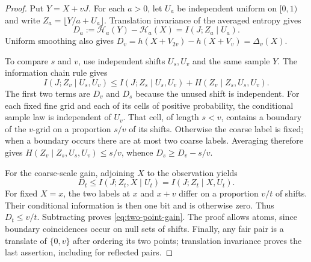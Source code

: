 \begin{proof}
Put $Y=X+vJ$.  For each $a>0$, let $U_a$ be independent uniform on
$[0,1)$ and write $Z_a=\lfloor Y/a+U_a\rfloor$.
Translation invariance of the averaged entropy gives
\[
 D_a:=\mathcal H_a(Y)-\mathcal H_a(X)=I(J;Z_a\mid U_a).
\]
Uniform smoothing also gives
$D_v=h(X+V_{2v})-h(X+V_v)=\Delta_v(X)$.

To compare $s$ and $v$, use independent shifts $U_s,U_v$ and the same
sample $Y$.  The information chain rule gives
\[
 I(J;Z_v\mid U_s,U_v)
 \le I(J;Z_s\mid U_s,U_v)
       +H(Z_v\mid Z_s,U_s,U_v).
\]
The first two terms are $D_v$ and $D_s$ because the unused shift is
independent.  For each fixed fine grid and each of its cells of positive
probability, the conditional sample law is independent of $U_v$.
That cell, of length $s<v$, contains a boundary of the $v$-grid on a
proportion $s/v$ of its shifts.  Otherwise the coarse label is fixed;
when a boundary occurs there are at most two coarse labels.  Averaging
therefore gives
$H(Z_v\mid Z_s,U_s,U_v)\le s/v$, whence $D_s\ge D_v-s/v$.

For the coarse-scale gain, adjoining $X$ to the observation yields
\[
 D_t\le I(J;Z_t,X\mid U_t)=I(J;Z_t\mid X,U_t).
\]
For fixed $X=x$, the two labels at $x$ and $x+v$ differ on a proportion
$v/t$ of shifts.  Their conditional information is then one bit and is
otherwise zero.  Thus $D_t\le v/t$.  Subtracting proves
\eqref{eq:two-point-gain}.  The proof allows atoms, since boundary
coincidences occur on null sets of shifts.  Finally, any fair pair is a
translate of $\{0,v\}$ after ordering its two points; translation
invariance proves the last assertion, including for reflected pairs.
\end{proof}

